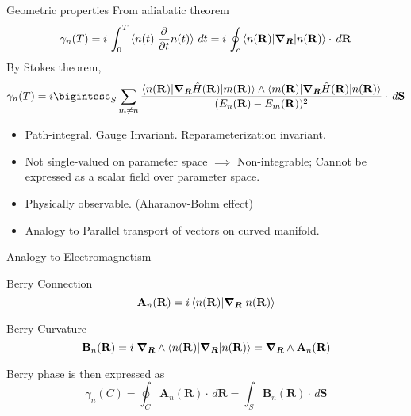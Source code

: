 \documentclass{beamer}
\begin{document}
\begin{frame}{Geometric properties}
From adiabatic theorem
    \begin{equation*}
     \gamma_{n}(T) = i\,\int_{0}^{T}{\braket{n(t) | \frac{\partial}{\partial t} n(t)}\, dt} = i\, \oint_{c}{\braket{n(\mathbf{R})| \bm{\nabla_{R}} | n(\mathbf{R})} \cdot \, d\mathbf{R}}
    \end{equation*}
    By Stokes theorem,
    \small\begin{equation*}
     \gamma_{n}(T) = i \bigintsss_{S}{\,\sum_{m \neq n}{\frac{\braket{n(\mathbf{R})|\bm{\nabla_{R}}\hat{H}(\mathbf{R})|m(\mathbf{R})} \wedge \braket{m(\mathbf{R})|\bm{\nabla_{R}}\hat{H}(\mathbf{R})|n(\mathbf{R})}}{(E_{n}(\mathbf{R})- E_{m}(\mathbf{R}))^2}} \cdot \, d\mathbf{S}}
    \end{equation*}\normalsize
  \begin{itemize}
  \item{
    Path-integral. Gauge Invariant. Reparameterization invariant.
  }
  \item {
    Not single-valued on parameter space $\implies$ Non-integrable; Cannot be expressed as a scalar field over parameter space.
  }
  \item {
    Physically observable. (Aharanov-Bohm effect)
  }
  \item {
    Analogy to Parallel transport of vectors on curved manifold.
  }
  \end{itemize}
\end{frame}

\begin{frame}{Analogy to Electromagnetism}
\begin{block}{Berry Connection}
\begin{equation}
 \mathbf{A}_{n}(\mathbf{R}) = i\braket{n(\mathbf{R})| \bm{\nabla_{R}} | n(\mathbf{R})}
\end{equation}
\end{block}
\begin{block}{Berry Curvature}
\begin{equation}
 \mathbf{B}_{n}(\mathbf{R}) = i \;\bm{\nabla_{R}} \wedge \braket{n(\mathbf{R})| \bm{\nabla_{R}} | n(\mathbf{R})} = \bm{\nabla_{R}} \wedge \mathbf{A}_{n}(\mathbf{R})
\end{equation}
\end{block}
Berry phase is then expressed as
\begin{equation}
 \gamma_{n}(C)= \oint_{C}{\mathbf{A}_{n}(\mathbf{R})\cdot \, d\mathbf{R}} = \int_{S}{\mathbf{B}_{n}(\mathbf{R})\cdot \, d\mathbf{S}}
\end{equation}
\end{frame}
\end{document}
